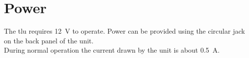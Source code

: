 \section{Power}
The \gls{tlu} requires 12~V to operate. Power can be provided using the circular jack on the back panel of the unit.\\
During normal operation the current drawn by the unit is about 0.5~A.
%
%
%
